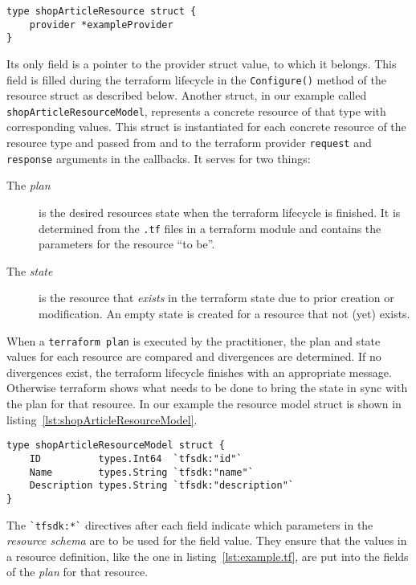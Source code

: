 \documentclass[paper=a4,11pt,numbers=noenddot]{article}
\begin{document}
\begin{lstlisting}[label=lst:shopArticleResource]
type shopArticleResource struct {
	provider *exampleProvider
}
\end{lstlisting}

Its only field is a pointer to the provider struct value, to which it belongs. This field is filled during the terraform lifecycle in the \verb'Configure()' method of the resource struct as described below. Another struct, in our example called \verb'shopArticleResourceModel', represents a concrete resource of that type with corresponding values. This struct is instantiated for each concrete resource of the resource type and passed from and to the terraform provider \verb'request' and \verb'response' arguments in the callbacks. It serves for two things:

\begin{description}
\item[The \emph{plan}] is the desired resources state when the terraform lifecycle is finished. It is determined from the \verb'.tf' files in a terraform module and contains the parameters for the resource ``to be''.
\item[The \emph{state}] is the resource that \emph{exists} in the terraform state due to prior creation or modification. An empty state is created for a resource that not (yet) exists.
\end{description}

When a \verb'terraform plan' is executed by the practitioner, the plan and state values for each resource are compared and divergences are determined. If no divergences exist, the terraform lifecycle finishes with an appropriate message. Otherwise terraform shows what needs to be done to bring the state in sync with the plan for that resource. In our example the resource model struct is shown in listing~\ref{lst:shopArticleResourceModel}.

\begin{lstlisting}[label=lst:shopArticleResourceModel]
type shopArticleResourceModel struct {
	ID          types.Int64  `tfsdk:"id"`
	Name        types.String `tfsdk:"name"`
	Description types.String `tfsdk:"description"`
}
\end{lstlisting}

The \verb'`tfsdk:*`' directives after each field indicate which parameters in the \emph{resource schema} are to be used for the field value. They ensure that the values in a resource definition, like the one in listing~\ref{lst:example.tf}, are put into the fields of the \emph{plan} for that resource.
\end{document}

